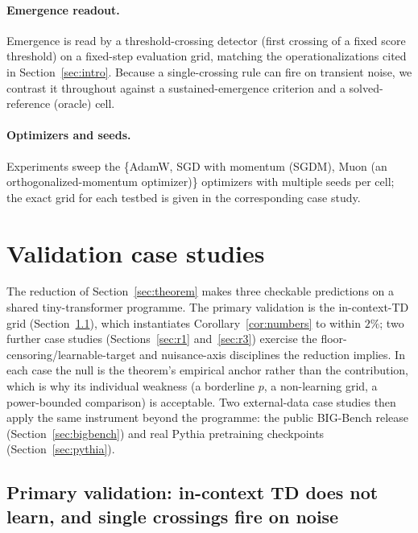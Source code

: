 \documentclass[11pt]{article}
\theoremstyle{plain}
\theoremstyle{definition}
\begin{document}
\paragraph{Emergence readout.} Emergence is read by a threshold-crossing detector (first
crossing of a fixed score threshold) on a fixed-step evaluation grid, matching the
operationalizations cited in Section~\ref{sec:intro}. Because a single-crossing
rule can fire on transient noise, we contrast it throughout against a sustained-emergence
criterion and a solved-reference (oracle) cell.

\paragraph{Optimizers and seeds.} Experiments sweep the \{AdamW, SGD with momentum (SGDM),
Muon (an orthogonalized-momentum optimizer)\} optimizers with multiple seeds per cell; the
exact grid for each testbed is given in the corresponding case study.

\section{Validation case studies}\label{sec:results}

The reduction of Section~\ref{sec:theorem} makes three checkable predictions on a shared
tiny-transformer programme. The primary validation is the in-context-TD grid
(Section~\ref{sec:r2}), which instantiates Corollary~\ref{cor:numbers} to within $2\%$; two
further case studies (Sections~\ref{sec:r1} and~\ref{sec:r3}) exercise the
floor-censoring/learnable-target and nuisance-axis disciplines the reduction implies. In
each case the null is the theorem's empirical anchor rather than the contribution, which is
why its individual weakness (a borderline $p$, a non-learning grid, a power-bounded
comparison) is acceptable. Two external-data case studies then apply the same instrument
beyond the programme: the public BIG-Bench release (Section~\ref{sec:bigbench}) and real
Pythia pretraining checkpoints (Section~\ref{sec:pythia}).

\subsection{Primary validation: in-context TD does not learn, and single crossings fire on noise}\label{sec:r2}
\end{document}
